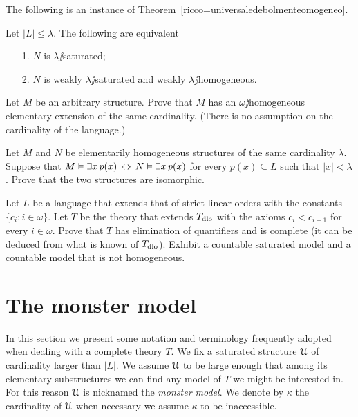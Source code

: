 \documentclass[creche.tex]{subfiles}
\begin{document}
The following is an instance of Theorem~\ref{ricco=universaledebolmenteomogeneo}.

\begin{corollary}\label{saturo=universaledebolmenteomogeneo}
Let $|L|\le\lambda$. The following are equivalent\nobreak
\begin{itemize}
\item[1.] $N$ is $\lambda\jj$saturated;
\item[2.] $N$ is weakly $\lambda\jj$saturated and weakly $\lambda\jj$homogeneous.\QED
\end{itemize}
\end{corollary}


\begin{exercise}\label{ex_omega_homogeneous_same_card}
Let $M$ be an arbitrary structure. Prove that $M$ has an $\omega\jj$homogeneous elementary extension of the same cardinality. (There is no assumption on the cardinality of the language.)\QED 
\end{exercise}

\begin{exercise}
Let $M$ and $N$ be elementarily homogeneous structures of the same cardinality $\lambda$. Suppose that $M\vDash\exists x\, p(x)\,\Leftrightarrow\,N\vDash\exists x\, p(x)$ for every $p(x)\subseteq L$ such that $|x|<\lambda$. Prove that the two structures are isomorphic.\QED 
\end{exercise}

\begin{exercise}\label{vaughtesempio}
Let $L$ be a language that extends that of strict linear orders with the constants $\{c_i: i\in\omega\}$. Let $T$ be the theory that extends $T_{\rm dlo}$ with the axioms $c_i<c_{i+1}$ for every  $i\in\omega$. Prove that $T$ has elimination of quantifiers and is complete (it can be deduced from what is known of $T_{\rm dlo}$). Exhibit a countable saturated model and a countable model that is not homogeneous.\QED 
\end{exercise}

\section{The monster model}\label{monster}

\label{compattezzasaturazione}


In this section we present some notation and terminology frequently adopted when dealing with a complete theory $T$. We fix a saturated structure $\EuScript U$ of cardinality larger than $|L|$. We assume $\EuScript U$ to be large enough that among its elementary substructures we can find any model of $T$ we might be interested in. For this reason $\EuScript U$ is nicknamed the \emph{monster model}. We denote by $\kappa$ the cardinality of $\EuScript U$ when necessary we assume $\kappa$ to be inaccessible. 
\end{document}
